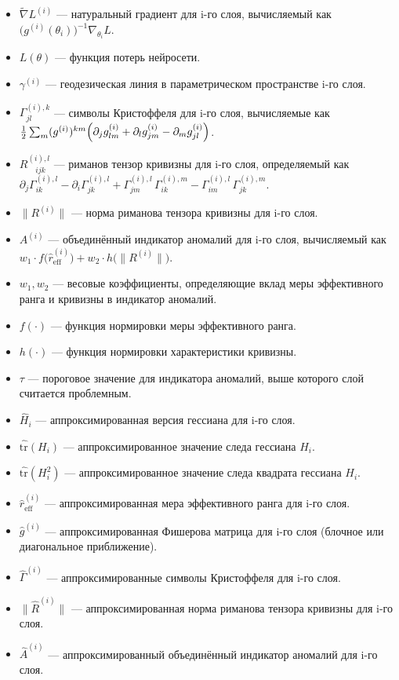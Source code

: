 \documentclass[a4paper,12pt]{article}
\begin{document}
\begin{itemize}
\item \(\tilde{\nabla} L^{(i)}\) --- натуральный градиент для i-го слоя, вычисляемый как \(\bigl(g^{(i)}(\theta_i)\bigr)^{-1}\nabla_{\theta_i} L\).
\item \(L(\theta)\) --- функция потерь нейросети.
\item \(\gamma^{(i)}\) --- геодезическая линия в параметрическом пространстве i-го слоя.
\item \(\Gamma^{(i),k}_{jl}\) --- символы Кристоффеля для i-го слоя, вычисляемые как \(\frac{1}{2}\sum_{m}(g^{(i)})^{km}\Bigl(\partial_j g^{(i)}_{lm} + \partial_l g^{(i)}_{jm} - \partial_m g^{(i)}_{jl}\Bigr)\).
\item \(R^{(i),l}_{\quad ijk}\) --- риманов тензор кривизны для i-го слоя, определяемый как \(\partial_j \Gamma^{(i),l}_{ik} - \partial_i \Gamma^{(i),l}_{jk} + \Gamma^{(i),l}_{jm}\,\Gamma^{(i),m}_{ik} - \Gamma^{(i),l}_{im}\,\Gamma^{(i),m}_{jk}\).
\item \(\|R^{(i)}\|\) --- норма риманова тензора кривизны для i-го слоя.
\item \(A^{(i)}\) --- объединённый индикатор аномалий для i-го слоя, вычисляемый как \(w_1 \cdot f\bigl(\hat{r}_{\text{eff}}^{(i)}\bigr) + w_2 \cdot h\bigl(\|R^{(i)}\|\bigr)\).
\item \(w_1, w_2\) --- весовые коэффициенты, определяющие вклад меры эффективного ранга и кривизны в индикатор аномалий.
\item \(f(\cdot)\) --- функция нормировки меры эффективного ранга.
\item \(h(\cdot)\) --- функция нормировки характеристики кривизны.
\item \(\tau\) --- пороговое значение для индикатора аномалий, выше которого слой считается проблемным.
\item \(\hat{H}_i\) --- аппроксимированная версия гессиана для i-го слоя.
\item \(\widehat{\mathrm{tr}}(H_i)\) --- аппроксимированное значение следа гессиана \(H_i\).
\item \(\widehat{\mathrm{tr}}(H_i^2)\) --- аппроксимированное значение следа квадрата гессиана \(H_i\).
\item \(\widehat{r}_{\text{eff}}^{(i)}\) --- аппроксимированная мера эффективного ранга для i-го слоя.
\item \(\hat{g}^{(i)}\) --- аппроксимированная Фишерова матрица для i-го слоя (блочное или диагональное приближение).
\item \(\hat{\Gamma}^{(i)}\) --- аппроксимированные символы Кристоффеля для i-го слоя.
\item \(\|\hat{R}^{(i)}\|\) --- аппроксимированная норма риманова тензора кривизны для i-го слоя.
\item \(\hat{A}^{(i)}\) --- аппроксимированный объединённый индикатор аномалий для i-го слоя.
\end{itemize}
\end{document}
